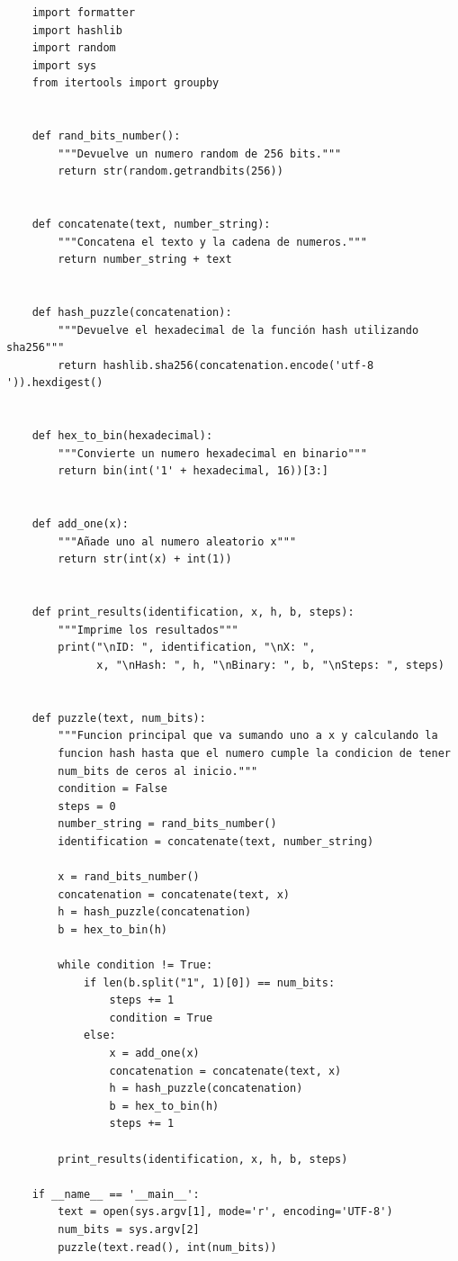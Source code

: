 \documentclass[10pt,a4paper,spanish]{report}
\begin{document}
\begin{verbatim}
	import formatter
	import hashlib
	import random
	import sys
	from itertools import groupby


	def rand_bits_number():
		"""Devuelve un numero random de 256 bits."""
	    return str(random.getrandbits(256))


	def concatenate(text, number_string):
		"""Concatena el texto y la cadena de numeros."""
	    return number_string + text


	def hash_puzzle(concatenation):
		"""Devuelve el hexadecimal de la función hash utilizando sha256"""
	    return hashlib.sha256(concatenation.encode('utf-8 ')).hexdigest()


	def hex_to_bin(hexadecimal):
		"""Convierte un numero hexadecimal en binario"""
	    return bin(int('1' + hexadecimal, 16))[3:]


	def add_one(x):
		"""Añade uno al numero aleatorio x"""
	    return str(int(x) + int(1))


	def print_results(identification, x, h, b, steps):
		"""Imprime los resultados"""
	    print("\nID: ", identification, "\nX: ",
	          x, "\nHash: ", h, "\nBinary: ", b, "\nSteps: ", steps)


	def puzzle(text, num_bits):
		"""Funcion principal que va sumando uno a x y calculando la
		funcion hash hasta que el numero cumple la condicion de tener
		num_bits de ceros al inicio."""
	    condition = False
	    steps = 0
	    number_string = rand_bits_number()
	    identification = concatenate(text, number_string)

	    x = rand_bits_number()
	    concatenation = concatenate(text, x)
	    h = hash_puzzle(concatenation)
	    b = hex_to_bin(h)

	    while condition != True:
	        if len(b.split("1", 1)[0]) == num_bits:
	            steps += 1
	            condition = True
	        else:
	            x = add_one(x)
	            concatenation = concatenate(text, x)
	            h = hash_puzzle(concatenation)
	            b = hex_to_bin(h)
	            steps += 1

	    print_results(identification, x, h, b, steps)

	if __name__ == '__main__':
	    text = open(sys.argv[1], mode='r', encoding='UTF-8')
	    num_bits = sys.argv[2]
	    puzzle(text.read(), int(num_bits))
\end{verbatim}

\end{document}
